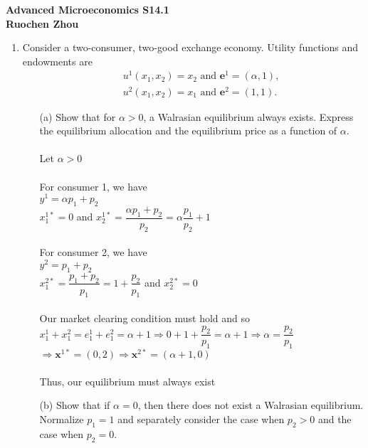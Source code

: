\documentclass[11pt]{article}
\begin{document}
\begin{center}
\textbf{Advanced Microeconomics S14.1\\}
\textbf{Ruochen Zhou}
\end{center}

\begin{enumerate}
\item Consider a two-consumer, two-good exchange economy. Utility functions and endowments are
	\begin{eqnarray*}
	&&u^{1}(x_{1},x_{2})	=x_{2}\text{ and }\mathbf{e}^{1}=(\alpha,1),\\
	&&u^{2}(x_{1},x_{2})	=x_{1}\text{ and }\mathbf{e}^{2}=(1,1).
	\end{eqnarray*}
	
	\begin{itemize}
	\item[(a)] Show that for $\alpha>0$, a Walrasian equilibrium always exists. Express the equilibrium allocation and the equilibrium price as a function of $\alpha$.
	\smallskip\\\\
	Let $\alpha>0$\\\\
	For consumer 1, we have\\
	$y^1=\alpha p_1+p_2$\\
	$x_1^{1*}=0$ and $x_2^{1*}=\dfrac{\alpha p_1+p_2}{p_2}=\alpha\dfrac{p_1}{p_2}+1$\\\\
	For consumer 2, we have\\
	$y^2=p_1+p_2$\\
	$x_1^{2*}=\dfrac{p_1+p_2}{p_1}=1+\dfrac{p_2}{p_1}$ and $x_2^{2*}=0$\\\\
	Our market clearing condition must hold and so\\
	$x_1^1+x_1^2=e_1^1+e_1^2=\alpha+1\Rightarrow0+1+\dfrac{p_2}{p_1}=\alpha+1\Rightarrow\alpha=\dfrac{p_2}{p_1}$\\
	$\Rightarrow\textbf{x}^{1*}=(0,2)\Rightarrow\textbf{x}^{2*}=(\alpha+1,0)$\\\\
	Thus, our equilibrium must always exist\\
	\item[(b)] Show that if $\alpha=0$, then there does not exist a Walrasian equilibrium. Normalize $p_{1}=1$ and separately consider the case when $p_{2}>0$ and the case when $p_{2}=0$.
	\smallskip\\\\

\end{itemize}
\end{enumerate}
\end{document}
